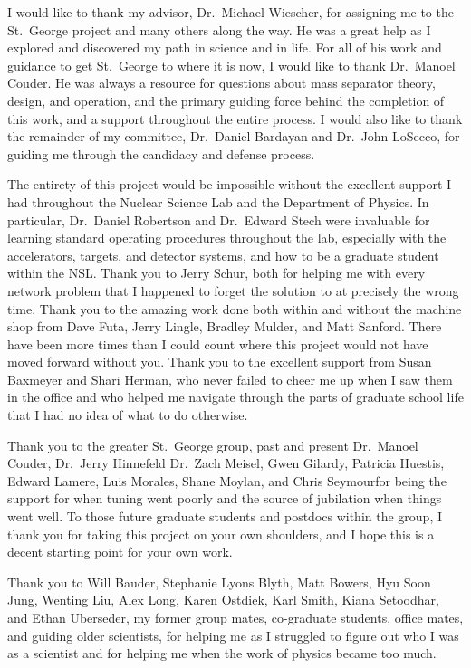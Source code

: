 \begin{acknowledge}

I would like to thank my advisor, Dr.\ Michael Wiescher, for assigning
me to the St.\ George project and many others along the way. He was a
great help as I explored and discovered my path in science and in life.
For all of his work and guidance to get St.\ George to where it is now,
I would like to thank Dr.\ Manoel Couder. He was always a resource for
questions about mass separator theory, design, and operation, and the
primary guiding force behind the completion of this work, and a support
throughout the entire process. I would also like to thank the remainder
of my committee, Dr.\ Daniel Bardayan and Dr.\ John LoSecco, for guiding
me through the candidacy and defense process.

The entirety of this project would be impossible without the excellent
support I had throughout the Nuclear Science Lab and the Department of
Physics. In particular, Dr.\ Daniel Robertson and Dr.\ Edward Stech were
invaluable for learning standard operating procedures throughout the
lab, especially with the accelerators, targets, and detector systems,
and how to be a graduate student within the NSL. Thank you to Jerry
Schur, both for helping me with every network problem that I happened to
forget the solution to at precisely the wrong time. Thank you to the
amazing work done both within and without the machine shop from Dave
Futa, Jerry Lingle, Bradley Mulder, and Matt Sanford. There have been
more times than I could count where this project would not have moved
forward without you. Thank you to the excellent support from Susan
Baxmeyer and Shari Herman, who never failed to cheer me up when I saw
them in the office and who helped me navigate through the parts of
graduate school life that I had no idea of what to do otherwise.

Thank you to the greater St.\ George group, past and
present\textemdash{} Dr.\ Manoel Couder, Dr.\ Jerry Hinnefeld Dr.\ Zach
Meisel, Gwen Gilardy, Patricia Huestis, Edward Lamere, Luis Morales,
Shane Moylan, and Chris Seymour\textemdash{}for being the support for
when tuning went poorly and the source of jubilation when things went
well. To those future graduate students and postdocs within the group, I
thank you for taking this project on your own shoulders, and I hope this
is a decent starting point for your own work.

Thank you to Will Bauder, Stephanie Lyons Blyth, Matt Bowers, Hyu Soon
Jung, Wenting Liu, Alex Long, Karen Ostdiek, Karl Smith, Kiana
Setoodhar, and Ethan Uberseder, my former group mates, co-graduate
students, office mates, and guiding older scientists, for helping me as
I struggled to figure out who I was as a scientist and for helping me
when the work of physics became too much.


\end{acknowledge}
